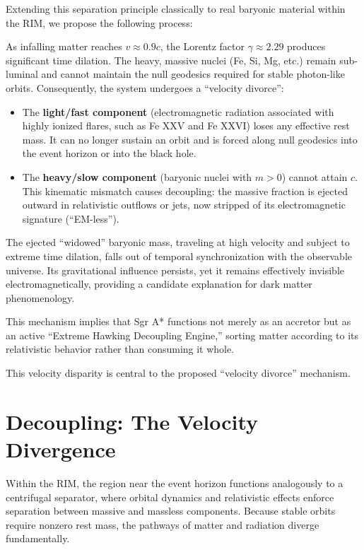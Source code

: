 \documentclass[12pt]{article}
\begin{document}
Extending this separation principle classically to real baryonic material within the RIM, we propose the following process:

As infalling matter reaches $v \approx 0.9c$, the Lorentz factor $\gamma \approx 2.29$ produces significant time dilation. The heavy, massive nuclei (Fe, Si, Mg, etc.) remain sub-luminal and cannot maintain the null geodesics required for stable photon-like orbits. Consequently, the system undergoes a ``velocity divorce'':

\begin{itemize}
    \item The \textbf{light/fast component} (electromagnetic radiation associated with highly ionized flares, such as Fe XXV and Fe XXVI) loses any effective rest mass. It can no longer sustain an orbit and is forced along null geodesics into the event horizon or into the black hole.
    \item The \textbf{heavy/slow component} (baryonic nuclei with $m > 0$) cannot attain $c$. This kinematic mismatch causes  decoupling: the massive fraction is ejected outward in relativistic outflows or jets, now stripped of its electromagnetic signature (``EM-less'').
\end{itemize}

The ejected ``widowed'' baryonic mass, traveling at high velocity and subject to extreme time dilation, falls out of temporal synchronization with the observable universe. Its gravitational influence persists, yet it remains effectively invisible electromagnetically, providing a candidate explanation for dark matter phenomenology.

This mechanism implies that Sgr A* functions not merely as an accretor but as an active ``Extreme Hawking Decoupling Engine,'' sorting matter according to its relativistic behavior rather than consuming it whole.

This velocity disparity is central to the proposed ``velocity divorce'' mechanism.

\section{ Decoupling: The Velocity Divergence}

Within the RIM, the region near the event horizon functions analogously to a centrifugal separator, where orbital dynamics and relativistic effects enforce separation between massive and massless components. Because stable orbits require nonzero rest mass, the pathways of matter and radiation diverge fundamentally.
\end{document}
